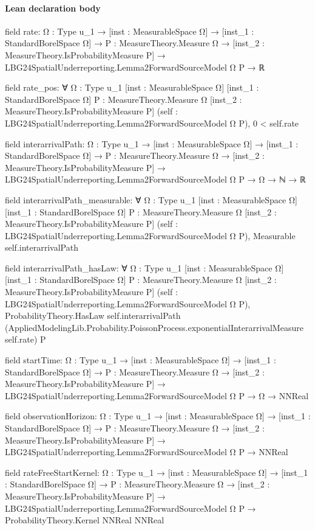 \documentclass[10pt]{article}
\begin{document}
\paragraph{Lean declaration body}
\begin{ReviewVerbatim}
field rate:
{Ω : Type u_1} →
  [inst : MeasurableSpace Ω] →
    [inst_1 : StandardBorelSpace Ω] →
      {P : MeasureTheory.Measure Ω} →
        [inst_2 : MeasureTheory.IsProbabilityMeasure P] → LBG24SpatialUnderreporting.Lemma2ForwardSourceModel Ω P → ℝ

field rate_pos:
∀ {Ω : Type u_1} [inst : MeasurableSpace Ω] [inst_1 : StandardBorelSpace Ω] {P : MeasureTheory.Measure Ω}
  [inst_2 : MeasureTheory.IsProbabilityMeasure P] (self : LBG24SpatialUnderreporting.Lemma2ForwardSourceModel Ω P),
  0 < self.rate

field interarrivalPath:
{Ω : Type u_1} →
  [inst : MeasurableSpace Ω] →
    [inst_1 : StandardBorelSpace Ω] →
      {P : MeasureTheory.Measure Ω} →
        [inst_2 : MeasureTheory.IsProbabilityMeasure P] →
          LBG24SpatialUnderreporting.Lemma2ForwardSourceModel Ω P → Ω → ℕ → ℝ

field interarrivalPath_measurable:
∀ {Ω : Type u_1} [inst : MeasurableSpace Ω] [inst_1 : StandardBorelSpace Ω] {P : MeasureTheory.Measure Ω}
  [inst_2 : MeasureTheory.IsProbabilityMeasure P] (self : LBG24SpatialUnderreporting.Lemma2ForwardSourceModel Ω P),
  Measurable self.interarrivalPath

field interarrivalPath_hasLaw:
∀ {Ω : Type u_1} [inst : MeasurableSpace Ω] [inst_1 : StandardBorelSpace Ω] {P : MeasureTheory.Measure Ω}
  [inst_2 : MeasureTheory.IsProbabilityMeasure P] (self : LBG24SpatialUnderreporting.Lemma2ForwardSourceModel Ω P),
  ProbabilityTheory.HasLaw self.interarrivalPath
    (AppliedModelingLib.Probability.PoissonProcess.exponentialInterarrivalMeasure self.rate) P

field startTime:
{Ω : Type u_1} →
  [inst : MeasurableSpace Ω] →
    [inst_1 : StandardBorelSpace Ω] →
      {P : MeasureTheory.Measure Ω} →
        [inst_2 : MeasureTheory.IsProbabilityMeasure P] →
          LBG24SpatialUnderreporting.Lemma2ForwardSourceModel Ω P → Ω → NNReal

field observationHorizon:
{Ω : Type u_1} →
  [inst : MeasurableSpace Ω] →
    [inst_1 : StandardBorelSpace Ω] →
      {P : MeasureTheory.Measure Ω} →
        [inst_2 : MeasureTheory.IsProbabilityMeasure P] →
          LBG24SpatialUnderreporting.Lemma2ForwardSourceModel Ω P → NNReal

field rateFreeStartKernel:
{Ω : Type u_1} →
  [inst : MeasurableSpace Ω] →
    [inst_1 : StandardBorelSpace Ω] →
      {P : MeasureTheory.Measure Ω} →
        [inst_2 : MeasureTheory.IsProbabilityMeasure P] →
          LBG24SpatialUnderreporting.Lemma2ForwardSourceModel Ω P → ProbabilityTheory.Kernel NNReal NNReal


\end{ReviewVerbatim}
\end{document}

